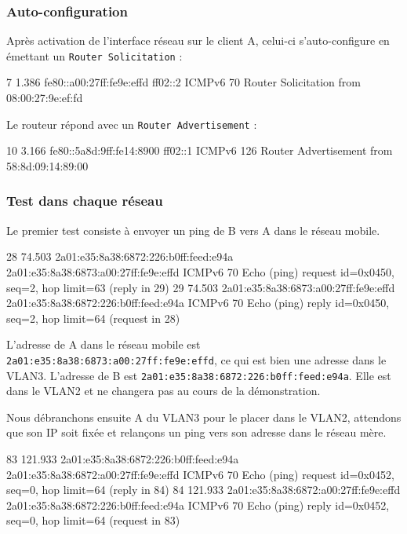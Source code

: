 \subsubsection{Auto-configuration}


Après activation de l'interface réseau sur le client A, celui-ci s'auto-configure en émettant un \texttt{Router Solicitation} :

\begin{paquet}
7	1.386	fe80::a00:27ff:fe9e:effd	ff02::2	ICMPv6	70	Router Solicitation from 08:00:27:9e:ef:fd
\end{paquet}

Le routeur répond avec un \texttt{Router Advertisement} :

\begin{paquet}
10	3.166	fe80::5a8d:9ff:fe14:8900	ff02::1	ICMPv6	126	Router Advertisement from 58:8d:09:14:89:00
\end{paquet}

\subsubsection{Test dans chaque réseau}

Le premier test consiste à envoyer un ping de B vers A dans le réseau mobile.

\begin{paquet}
28	74.503	2a01:e35:8a38:6872:226:b0ff:feed:e94a	2a01:e35:8a38:6873:a00:27ff:fe9e:effd	ICMPv6	70	Echo (ping) request id=0x0450, seq=2, hop limit=63 (reply in 29)
29	74.503	2a01:e35:8a38:6873:a00:27ff:fe9e:effd	2a01:e35:8a38:6872:226:b0ff:feed:e94a	ICMPv6	70	Echo (ping) reply id=0x0450, seq=2, hop limit=64 (request in 28)
\end{paquet}

L'adresse de A dans le réseau mobile est \texttt{2a01:e35:8a38:6873:a00:27ff:fe9e:effd}, ce qui est bien une adresse dans le VLAN3.
L'adresse de B est \texttt{2a01:e35:8a38:6872:226:b0ff:feed:e94a}.
Elle est dans le VLAN2 et ne changera pas au cours de la démonstration.

Nous débranchons ensuite A du VLAN3 pour le placer dans le VLAN2, attendons que son IP soit fixée et relançons un ping vers son adresse dans le réseau mère.

\begin{paquet}
83	121.933	2a01:e35:8a38:6872:226:b0ff:feed:e94a	2a01:e35:8a38:6872:a00:27ff:fe9e:effd	ICMPv6	70	Echo (ping) request id=0x0452, seq=0, hop limit=64 (reply in 84)
84	121.933	2a01:e35:8a38:6872:a00:27ff:fe9e:effd	2a01:e35:8a38:6872:226:b0ff:feed:e94a	ICMPv6	70	Echo (ping) reply id=0x0452, seq=0, hop limit=64 (request in 83)
\end{paquet}

